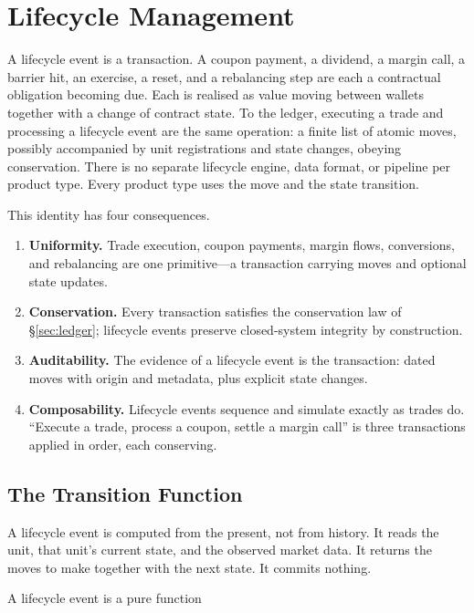 \section{Lifecycle Management}
\label{sec:lifecycle}

A lifecycle event is a transaction. A coupon payment, a dividend, a margin call, a barrier hit, an exercise, a reset, and a rebalancing step are each a contractual obligation becoming due. Each is realised as value moving between wallets together with a change of contract state. To the ledger, executing a trade and processing a lifecycle event are the same operation: a finite list of atomic moves, possibly accompanied by unit registrations and state changes, obeying conservation. There is no separate lifecycle engine, data format, or pipeline per product type. Every product type uses the move and the state transition.

This identity has four consequences.

\begin{enumerate}[nosep]
\item \textbf{Uniformity.} Trade execution, coupon payments, margin flows, conversions, and rebalancing are one primitive---a transaction carrying moves and optional state updates.
\item \textbf{Conservation.} Every transaction satisfies the conservation law of \S\ref{sec:ledger}; lifecycle events preserve closed-system integrity by construction.
\item \textbf{Auditability.} The evidence of a lifecycle event is the transaction: dated moves with origin and metadata, plus explicit state changes.
\item \textbf{Composability.} Lifecycle events sequence and simulate exactly as trades do. ``Execute a trade, process a coupon, settle a margin call'' is three transactions applied in order, each conserving.
\end{enumerate}

\subsection{The Transition Function}

A lifecycle event is computed from the present, not from history. It reads the unit, that unit's current state, and the observed market data. It returns the moves to make together with the next state. It commits nothing.

A lifecycle event is a pure function

